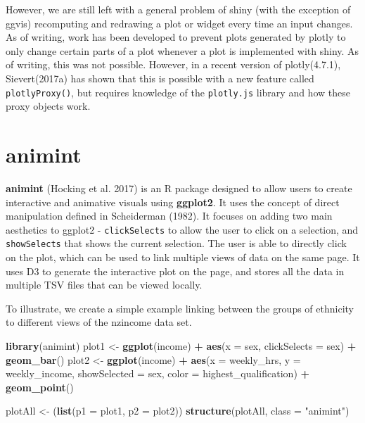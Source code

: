 \documentclass[11pt,]{report}
\newenvironment{Shaded}{\begin{snugshade}}{\end{snugshade}}
\newcommand{\KeywordTok}[1]{\textcolor[rgb]{0.13,0.29,0.53}{\textbf{#1}}}
\newcommand{\DataTypeTok}[1]{\textcolor[rgb]{0.13,0.29,0.53}{#1}}
\newcommand{\StringTok}[1]{\textcolor[rgb]{0.31,0.60,0.02}{#1}}
\newcommand{\OperatorTok}[1]{\textcolor[rgb]{0.81,0.36,0.00}{\textbf{#1}}}
\newcommand{\NormalTok}[1]{#1}
\begin{document}
However, we are still left with a general problem of \textsf{shiny}
(with the exception of \textsf{ggvis}) recomputing and redrawing a plot
or widget every time an input changes. As of writing, work has been
developed to prevent plots generated by plotly to only change certain
parts of a plot whenever a plot is implemented with shiny. As of
writing, this was not possible. However, in a recent version of
plotly(4.7.1), Sievert(2017a) has shown that this is possible with a new
feature called \texttt{plotlyProxy()}, but requires knowledge of the
\texttt{plotly.js} library and how these proxy objects work.

\section{animint}\label{animint}

\textbf{animint} (Hocking et al. 2017) is an R package designed to allow
users to create interactive and animative visuals using
\textbf{ggplot2}. It uses the concept of direct manipulation defined in
Scheiderman (1982). It focuses on adding two main aesthetics to ggplot2
- \texttt{clickSelects} to allow the user to click on a selection, and
\texttt{showSelects} that shows the current selection. The user is able
to directly click on the plot, which can be used to link multiple views
of data on the same page. It uses D3 to generate the interactive plot on
the page, and stores all the data in multiple TSV files that can be
viewed locally.

To illustrate, we create a simple example linking between the groups of
ethnicity to different views of the nzincome data set.

\begin{Shaded}
\begin{Highlighting}[]
\KeywordTok{library}\NormalTok{(animint)}
\NormalTok{plot1 <-}\StringTok{ }\KeywordTok{ggplot}\NormalTok{(income) }\OperatorTok{+}\StringTok{ }\KeywordTok{aes}\NormalTok{(}\DataTypeTok{x =}\NormalTok{ sex, }\DataTypeTok{clickSelects =}\NormalTok{ sex) }\OperatorTok{+}\StringTok{ }\KeywordTok{geom_bar}\NormalTok{()}
\NormalTok{plot2 <-}\StringTok{ }\KeywordTok{ggplot}\NormalTok{(income) }\OperatorTok{+}\StringTok{ }\KeywordTok{aes}\NormalTok{(}\DataTypeTok{x =}\NormalTok{ weekly_hrs, }\DataTypeTok{y =}\NormalTok{ weekly_income, }\DataTypeTok{showSelected =}\NormalTok{ sex,}
                              \DataTypeTok{color =}\NormalTok{ highest_qualification) }\OperatorTok{+}\StringTok{ }\KeywordTok{geom_point}\NormalTok{()}

\NormalTok{plotAll <-}\StringTok{ }\NormalTok{(}\KeywordTok{list}\NormalTok{(}\DataTypeTok{p1 =}\NormalTok{ plot1, }\DataTypeTok{p2 =}\NormalTok{ plot2))}
\KeywordTok{structure}\NormalTok{(plotAll, }\DataTypeTok{class =} \StringTok{"animint"}\NormalTok{)}
\end{Highlighting}
\end{Shaded}
\end{document}
